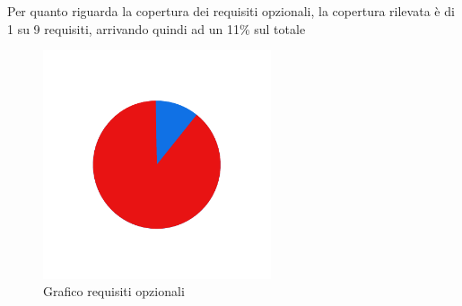 Per quanto riguarda la copertura dei requisiti opzionali, la copertura rilevata è di 1 su 9
requisiti, arrivando quindi ad un 11\% sul totale
\begin{figure}[H]
    \centering
    \includegraphics[width=0.6\textwidth]{images/requisiti_op.png}
    \caption{Grafico requisiti opzionali}
    \label{fig:Requisiti Opzionali}
\end{figure}





